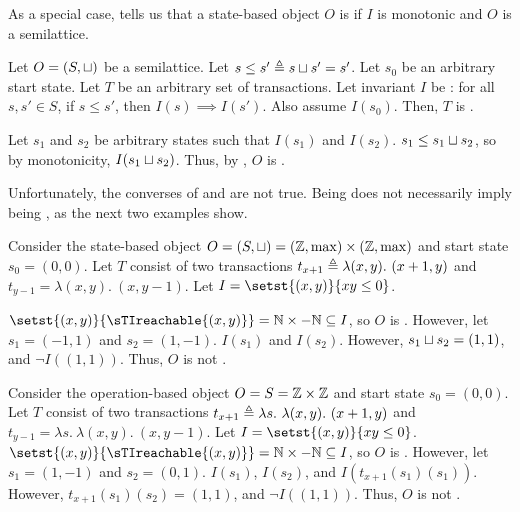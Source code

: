As a special case,  tells us that a state-based
object $O$ is \sTIconfluent{} if $I$ is monotonic and $O$ is a semilattice.

\begin{claim}
  Let $O = (S, \sqcup)$ be a semilattice. Let $s \leq s' \triangleq s \sqcup s' =
  s'$. Let $s_0$ be an arbitrary start state. Let $T$ be an arbitrary set of
  transactions. Let invariant $I$ be : for all $s, s'\in S$,
  if $s \leq s'$, then $I(s) \implies I(s')$. Also assume $I(s_0)$. Then, $T$
  is \sTIconfluent{}.
\end{claim}
\begin{elidableproof}
  Let $s_1$ and $s_2$ be arbitrary states such that $I(s_1)$ and $I(s_2)$. $s_1
  \leq s_1 \sqcup s_2$, so by monotonicity, $I(s_1 \sqcup s_2)$. Thus, by
  , $O$ is \sTIconfluent{}.
\end{elidableproof}

Unfortunately, the converses of  and
 are not true. Being \sTIconfluent{} does not
necessarily imply being \Iclosed{}, as the next two examples show.

\begin{example}
  Consider the state-based object $O = (S, \sqcup) = (\mathbb{Z}, \max) \times
  (\mathbb{Z}, \max)$ and start state $s_0 = (0, 0)$. Let $T$ consist of two
  transactions $t_{x+1} \triangleq \lambda (x, y).\ (x + 1, y)$ and $t_{y-1} =
  \lambda (x, y).\ (x, y - 1)$. Let $I = \setst{(x, y)}{xy \leq 0}$.

  $\setst{(x, y)}{\sTIreachable{(x, y)}} = \nats \times -\nats \subseteq I$, so
  $O$ is \sTIconfluent. However, let $s_1 = (-1, 1)$ and $s_2 = (1, -1)$.
  $I(s_1)$ and $I(s_2)$. However, $s_1 \sqcup s_2 = (1, 1)$, and $\lnot I((1,
  1))$. Thus, $O$ is not \Iclosed{}.
\end{example}

\begin{example}
  Consider the operation-based object $O = S = \mathbb{Z} \times \mathbb{Z}$ and start
  state $s_0 = (0, 0)$. Let $T$ consist of two transactions $t_{x+1} \triangleq
  \lambda s.\ \lambda (x, y).\ (x + 1, y)$ and $t_{y-1} = \lambda s.\ \lambda
  (x, y).\ (x, y - 1)$. Let $I = \setst{(x, y)}{xy \leq 0}$.
  $\setst{(x, y)}{\sTIreachable{(x, y)}} = \nats \times -\nats \subseteq I$, so
  $O$ is \sTIconfluent. However, let $s_1 = (1, -1)$ and $s_2 = (0, 1)$.
  $I(s_1)$, $I(s_2)$, and $I(t_{x+1}(s_1)(s_1))$. However, $t_{x+1}(s_1)(s_2) =
  (1, 1)$, and $\lnot I((1, 1))$. Thus, $O$ is not \Iclosed{}.
\end{example}

